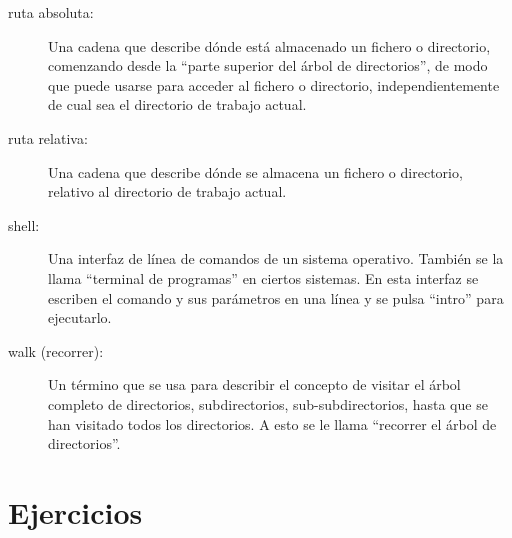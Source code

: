 \begin{description}
\item[ruta absoluta:] Una cadena que describe dónde está almacenado
un fichero o directorio, comenzando desde la ``parte superior del árbol de directorios'',
de modo que puede usarse para acceder al fichero o directorio, independientemente
de cual sea el directorio de trabajo actual.

\item[ruta relativa:] Una cadena que describe dónde se almacena
un fichero o directorio, relativo al directorio de trabajo
actual.

\item[shell:] Una interfaz de línea de comandos de un sistema operativo.
También se la llama ``terminal de programas'' en ciertos sistemas. En esta interfaz
se escriben el comando y sus parámetros en una línea y se pulsa ``intro''
para ejecutarlo.

\item[walk (recorrer):] Un término que se usa para describir el concepto de visitar
el árbol completo de directorios, subdirectorios, sub-subdirectorios,
hasta que se han visitado todos los directorios. A esto se le llama
``recorrer el árbol de directorios''.

\end{description}


\section{Ejercicios}

